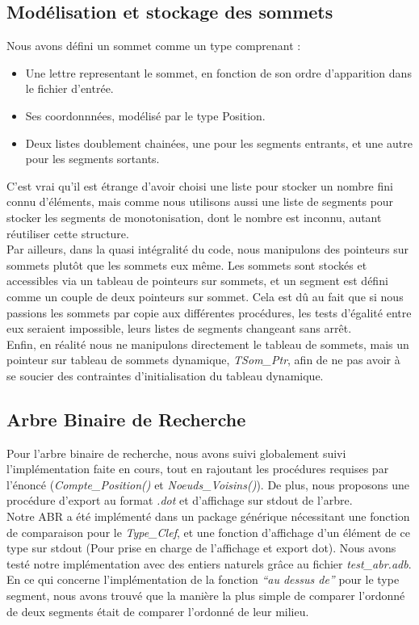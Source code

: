 \documentclass[10.9pt]{article}
\begin{document}
\subsection{Modélisation et stockage des sommets}
Nous avons défini un sommet comme un type comprenant :
\begin{itemize}
  \item Une lettre representant le sommet, en fonction de son ordre d'apparition
    dans le fichier d'entrée. 
  \item Ses coordonnnées, modélisé par le type Position.
  \item Deux listes doublement chainées, une pour les segments
    entrants, et une autre pour les segments sortants.
\end{itemize}
C'est vrai qu'il est étrange d'avoir choisi une liste pour stocker un
nombre fini connu d'éléments, mais comme nous utilisons aussi une liste
de segments pour stocker les segments de monotonisation, dont le
nombre est inconnu, autant réutiliser cette structure. \\
Par ailleurs, dans la quasi intégralité du code, nous manipulons des
pointeurs sur sommets plutôt que les sommets eux même. Les sommets
sont stockés et accessibles via un tableau de pointeurs sur sommets,
et un segment est défini comme un couple de deux pointeurs sur
sommet. Cela est dû au fait que si nous passions les sommets par copie
aux différentes procédures, les tests d'égalité entre eux seraient
impossible, leurs listes de segments changeant sans arrêt. \\
Enfin, en réalité nous ne manipulons directement le tableau de
sommets, mais un pointeur sur tableau de sommets dynamique,
\emph{TSom\_Ptr}, afin de ne pas avoir à se soucier des contraintes
d'initialisation du tableau dynamique.

\subsection{Arbre Binaire de Recherche}
Pour l'arbre binaire de recherche, nous avons suivi globalement suivi
l'implémentation faite en cours, tout en rajoutant les procédures
requises par l'énoncé (\emph{Compte\_Position()} et
\emph{Noeuds\_Voisins()}). De plus, nous proposons une procédure
d'export au format \emph{.dot} et d'affichage sur stdout de l'arbre.\\
Notre ABR a été implémenté dans un package générique nécessitant une
fonction de comparaison pour le \emph{Type\_Clef}, et une fonction
d'affichage d'un élément de ce type sur stdout (Pour prise en charge
de l'affichage et export dot). Nous avons testé notre implémentation
avec des entiers naturels grâce au fichier \emph{test\_abr.adb}. \\
En ce qui concerne l'implémentation de la fonction \emph{``au dessus
  de''} pour le type segment, nous avons trouvé que la manière la plus
simple de comparer l'ordonné de deux segments était de comparer
l'ordonné de leur milieu.
\end{document}
